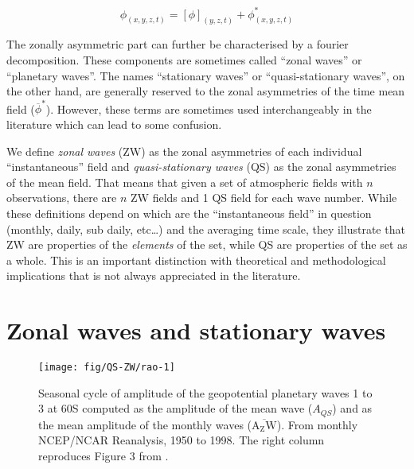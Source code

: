 \documentclass[draft,linenumbers]{agujournal2018}
\begin{document}
\begin{linenomath*}
\begin{equation}\label{eq:Z}
\phi_{(x, y, z, t)} = [\phi]_{(y, z, t)} + \phi_{(x, y, z, t)}^*
\end{equation}
\end{linenomath*}

The zonally asymmetric part can further be characterised by a fourier
decomposition. These components are sometimes called ``zonal waves'' or
``planetary waves''. The names ``stationary waves'' or
``quasi-stationary waves'', on the other hand, are generally reserved to
the zonal asymmetries of the time mean field (\(\overline{\phi}^*\)).
However, these terms are sometimes used interchangeably in the
literature
\citep[e.g.][]{Rao2004, Raphael2004, Kravchenko2012, Irving2015, Turner2017, Lastovicka2018}
which can lead to some confusion.

We define \emph{zonal waves} (ZW) as the zonal asymmetries of each
individual ``instantaneous'' field and \emph{quasi-stationary waves}
(QS) as the zonal asymmetries of the mean field. That means that given a
set of atmospheric fields with \(n\) observations, there are \(n\) ZW
fields and 1 QS field for each wave number. While these definitions
depend on which are the ``instantaneous field'' in question (monthly,
daily, sub daily, etc\ldots{}) and the averaging time scale, they
illustrate that ZW are properties of the \emph{elements} of the set,
while QS are properties of the set as a whole. This is an important
distinction with theoretical and methodological implications that is not
always appreciated in the literature.

\section{Zonal waves and stationary waves}

\begin{figure}[h]

{\centering \texttt{[image: fig/QS-ZW/rao-1]} 

}

\caption{Seasonal cycle of amplitude of the geopotential planetary waves 1 to 3 at 60\degree S computed as the amplitude of the mean wave ($A_{QS}$) and as the mean amplitude of the monthly waves ($\overline{\mathrm{A_ZW}}$). From monthly NCEP/NCAR Reanalysis, 1950 to 1998. The right column reproduces Figure 3 from \citet{Rao2004}.}\label{fig:rao}
\end{figure}
\end{document}
